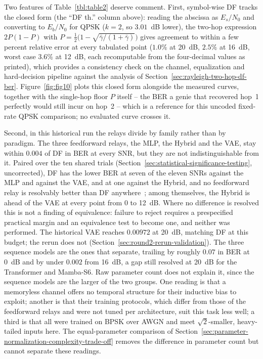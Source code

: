 Two features of Table~\ref{tbl:table2} deserve comment. First, symbol-wise DF tracks the closed form (the ``DF th.'' column above): reading the abscissa as $E_s/N_0$ and converting to $E_b/N_0$ for QPSK ($k=2$, so $3.01$~dB lower), the two-hop expression $2P(1-P)$ with $P=\tfrac12\bigl(1-\sqrt{\bar\gamma/(1+\bar\gamma)}\bigr)$ gives agreement to within a few percent relative error at every tabulated point ($1.0\%$ at 20~dB, $2.5\%$ at 16~dB, worst case $3.6\%$ at 12~dB, each recomputable from the four-decimal values as printed), which provides a consistency check on the channel, equalization and hard-decision pipeline against the analysis of Section~\ref{sec:rayleigh-two-hop-df-ber}. Figure~\ref{fig:fig10} plots this closed form alongside the measured curves, together with the single-hop floor $P$ itself -- the BER a genie that recovered hop~1 perfectly would still incur on hop~2 -- which is a reference for this uncoded fixed-rate QPSK comparison; no evaluated curve crosses it.

Second, in this historical run the relays divide by family rather than by paradigm. The three feedforward relays, the MLP, the Hybrid and the VAE, stay within $0.004$ of DF in BER at every SNR, but they are not indistinguishable from it. Paired over the ten shared trials (Section~\ref{sec:statistical-significance-testing}, uncorrected), DF has the lower BER at seven of the eleven SNRs against the MLP and against the VAE, and at one against the Hybrid, and no feedforward relay is resolvably better than DF anywhere~; among themselves, the Hybrid is ahead of the VAE at every point from 0 to 12~dB. Where no difference is resolved this is not a finding of equivalence: failure to reject requires a prespecified practical margin and an equivalence test to become one, and neither was performed. The historical VAE reaches $0.00972$ at 20~dB, matching DF at this budget; the rerun does not (Section~\ref{sec:round2-rerun-validation}). The three sequence models are the ones that separate, trailing by roughly $0.07$ in BER at 0~dB and by under $0.002$ from 16~dB, a gap still resolved at 20~dB for the Transformer and Mamba-S6. Raw parameter count does not explain it, since the sequence models are the larger of the two groups. One reading is that a memoryless channel offers no temporal structure for their inductive bias to exploit; another is that their training protocols, which differ from those of the feedforward relays and were not tuned per architecture, suit this task less well; a third is that all were trained on BPSK over AWGN and meet $\sqrt{2}$-smaller, heavy-tailed inputs here. The equal-parameter comparison of Section~\ref{sec:parameter-normalization-complexity-trade-off} removes the difference in parameter count but cannot separate these readings.


